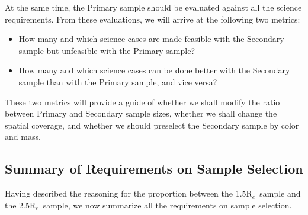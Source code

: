\documentclass[preprint,11pt]{aastex}
\newcommand{\Reff}{{R$_{e}$}}
\newcommand{\HI}{{\sc H\,i}}
\begin{document}
At the same time, the Primary sample should be evaluated against all the science requirements. From these evaluations, we will arrive at the following two metrics: 
\begin{itemize}
\item How many and which science cases are made feasible with the Secondary sample but unfeasible with the Primary sample?
\item How many and which science cases can be done better with the Secondary sample than with the Primary sample, and vice versa?
\end{itemize}

These two metrics will provide a guide of whether we shall modify the
ratio between Primary and Secondary sample sizes, whether we shall
change the spatial coverage, and whether we should preselect the
Secondary sample by color and mass.

\subsection{Summary of Requirements on Sample Selection}

Having described the reasoning for the proportion between the 1.5\Reff\ sample and the 2.5\Reff\ sample, we now summarize all the requirements on sample selection. %



\end{document}
